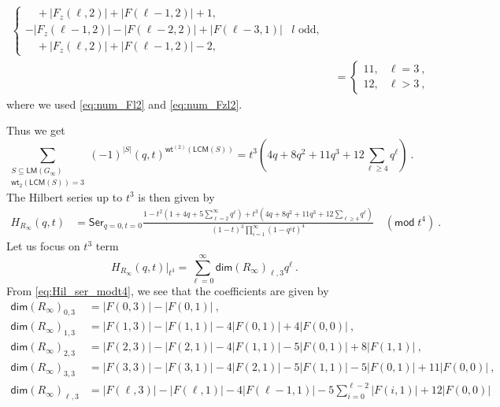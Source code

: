 \documentclass[a4paper,10pt]{article}
\newcommand{\mr}[1]{\mathsf{#1}}
\begin{document}
\begin{appendix}
\begin{enumerate}
\begin{equation}
\begin{aligned}
\begin{cases}
        \quad+|F_z(\ell,2)|+|F(\ell-1,2)| + 1,\\
        -|F_z(\ell-1,2)|-|F(\ell-2,2)| + |F(\ell-3,1)| & l \text{ odd},\\
        \quad+|F_z(\ell,2)|+|F(\ell-1,2)| -2,
    \end{cases}\\
    &= \begin{cases}
        11, & \ell = 3~,\\
        12, & \ell > 3~,
    \end{cases}
\end{aligned}
\end{equation}
where we used \eqref{eq:num_Fl2} and 
\eqref{eq:num_Fzl2}.
\end{enumerate}
Thus we get
\begin{equation}
\sum_{\substack{S \subseteq \mr{L M}\left(G_{\infty}\right) \\ \mr{wt}_2(\mr{LCM}(S))=3}}(-1)^{|S|}(q, t)^{\mathsf{wt}^{(2)}(\mr{LCM}(S))}=t^3\left(4 q+8 q^2+11 q^3+12 \sum_{\ell \geq 4} q^\ell\right)~.
\end{equation}
The Hilbert series up to $t^3$ is then given by
\begin{equation}\label{eq:Hil_ser_modt4}
\begin{aligned}
H_{R_\infty}(q,t) &=\mr{Ser}_{q=0,t=0} \frac{1-t^2(1+4q + 5\sum_{\ell=2}^\infty q^\ell)+t^3(4q + 8 q^2 + 11 q^3 + 12 \sum_{\ell\geq 4}q^\ell)}{(1-t)^3 \prod_{i=1}^{\infty}\left(1-q^i t\right)^4}\quad (\mr{mod} \;t^4)~.
\end{aligned}
\end{equation}
Let us focus on $t^3$ term
\begin{equation}
H_{R_\infty}(q,t)|_{t^3} = \sum_{\ell=0}^\infty \mr{dim}(R_\infty)_{\ell,3} q^\ell~.
\end{equation}
From \eqref{eq:Hil_ser_modt4}, we see that the coefficients are given by
\begin{equation}
\label{eq:coefficients_t3}
\begin{aligned}
\mr{dim}(R_\infty)_{0,3} &= |F(0,3)| - |F(0,1)|~, \\
\mr{dim}(R_\infty)_{1,3} &= |F(1,3)| - |F(1,1)| - 4 |F(0,1)|+4|F(0,0)|~,\\
\mr{dim}(R_\infty)_{2,3} &= |F(2,3)|-|F(2,1)|-4|F(1,1)|-5|F(0,1)|+8 |F(1,1)|~,\\
\mr{dim}(R_\infty)_{3,3} & = |F(3,3)|-|F(3,1)|-4 |F(2,1)|-5 |F(1,1)|-5|F(0,1)|+ 11 |F(0,0)|~,\\
\mr{dim}(R_\infty)_{\ell,3} &= |F(\ell,3)|-|F(\ell,1)|-4|F(\ell-1,1)|-5\sum_{i=0}^{\ell -2} |F(i,1)|+ 12 |F(0,0)| \quad 

\end{aligned}
\end{equation}
\end{appendix}
\end{document}
